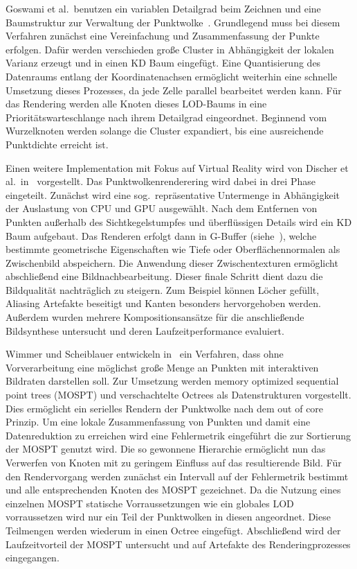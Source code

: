 \documentclass[hyperref, beleg, german]{cgvpub}
\begin{document}
Goswami et al.\ benutzen ein variablen Detailgrad beim Zeichnen und eine
Baumstruktur zur Verwaltung der Punktwolke~\cite{goswami2010high}. Grundlegend
muss bei diesem Verfahren zunächst eine Vereinfachung und Zusammenfassung der
Punkte erfolgen. Dafür werden verschieden große Cluster in Abhängigkeit der
lokalen Varianz erzeugt und in einen KD Baum eingefügt. Eine Quantisierung des
Datenraums entlang der Koordinatenachsen ermöglicht weiterhin eine schnelle
Umsetzung dieses Prozesses, da jede Zelle parallel bearbeitet werden kann. Für
das Rendering werden alle Knoten dieses LOD-Baums in eine
Prioritätswarteschlange nach ihrem Detailgrad eingeordnet. Beginnend vom
Wurzelknoten werden solange die Cluster expandiert, bis eine ausreichende
Punktdichte erreicht ist.

Einen weitere Implementation mit Fokus auf Virtual Reality wird von Discher et
al.\ in~\cite{discher2018point} vorgestellt. Das Punktwolkenrenderering wird
dabei in drei Phase eingeteilt. Zunächst wird eine sog.\ repräsentative
Untermenge in Abhängigkeit der Auslastung von CPU und GPU ausgewählt. Nach dem
Entfernen von Punkten außerhalb des Sichtkegelstumpfes und überflüssigen
Details wird ein KD Baum aufgebaut. Das Renderen erfolgt dann in G-Buffer
(siehe~\cite{saito1990comprehensible}), welche bestimmte geometrische
Eigenschaften wie Tiefe oder Oberflächennormalen als Zwischenbild abspeichern.
Die Anwendung dieser Zwischentexturen ermöglicht abschließend eine
Bildnachbearbeitung. Dieser finale Schritt dient dazu die Bildqualität
nachträglich zu steigern. Zum Beispiel können Löcher gefüllt, Aliasing
Artefakte beseitigt und Kanten besonders hervorgehoben werden. Außerdem wurden
mehrere Kompositionsansätze für die anschließende Bildsynthese untersucht und
deren Laufzeitperformance evaluiert.

Wimmer und Scheiblauer entwickeln in~\cite{wimmer2006instant} ein Verfahren,
dass ohne Vorverarbeitung eine möglichst große Menge an Punkten mit
interaktiven Bildraten darstellen soll. Zur Umsetzung werden memory optimized
sequential point trees (MOSPT) und verschachtelte Octrees als Datenstrukturen
vorgestellt. Dies ermöglicht ein serielles Rendern der Punktwolke nach dem out
of core Prinzip. Um eine lokale Zusammenfassung von Punkten und damit eine
Datenreduktion zu erreichen wird eine Fehlermetrik eingeführt die zur
Sortierung der MOSPT genutzt wird. Die so gewonnene Hierarchie ermöglicht nun
das Verwerfen von Knoten mit zu geringem Einfluss auf das resultierende Bild.
Für den Rendervorgang werden zunächst ein Intervall auf der Fehlermetrik
bestimmt und alle entsprechenden Knoten des MOSPT gezeichnet. Da die Nutzung
eines einzelnen MOSPT statische Vorraussetzungen wie ein globales LOD
vorraussetzen wird nur ein Teil der Punktwolken in diesen angeordnet. Diese
Teilmengen werden wiederum in einen Octree eingefügt. Abschließend wird der
Laufzeitvorteil der MOSPT untersucht und auf Artefakte des Renderingprozesses
eingegangen.
\end{document}
